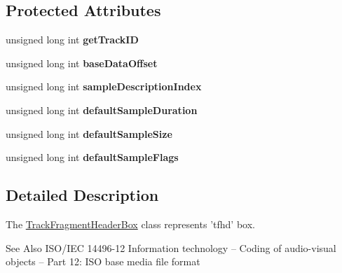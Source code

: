 \subsection*{Protected Attributes}
\begin{DoxyCompactItemize}
\item 
\hypertarget{class_track_fragment_header_box_a57b3fcda7632cb057f7366c6e553463d}{unsigned long int {\bfseries get\-Track\-I\-D}}\label{class_track_fragment_header_box_a57b3fcda7632cb057f7366c6e553463d}

\item 
\hypertarget{class_track_fragment_header_box_a7f7b9dd7d08115df2f90861151614d3b}{unsigned long int {\bfseries base\-Data\-Offset}}\label{class_track_fragment_header_box_a7f7b9dd7d08115df2f90861151614d3b}

\item 
\hypertarget{class_track_fragment_header_box_abf646a146a0412d93476177746e0e277}{unsigned long int {\bfseries sample\-Description\-Index}}\label{class_track_fragment_header_box_abf646a146a0412d93476177746e0e277}

\item 
\hypertarget{class_track_fragment_header_box_a4e2ecd660c328a452046f1a4c3546243}{unsigned long int {\bfseries default\-Sample\-Duration}}\label{class_track_fragment_header_box_a4e2ecd660c328a452046f1a4c3546243}

\item 
\hypertarget{class_track_fragment_header_box_afac1c5fa6d59ddaadb2290982fc18337}{unsigned long int {\bfseries default\-Sample\-Size}}\label{class_track_fragment_header_box_afac1c5fa6d59ddaadb2290982fc18337}

\item 
\hypertarget{class_track_fragment_header_box_aba2aa8846c5dac178978fe10f2acc733}{unsigned long int {\bfseries default\-Sample\-Flags}}\label{class_track_fragment_header_box_aba2aa8846c5dac178978fe10f2acc733}

\end{DoxyCompactItemize}


\subsection{Detailed Description}
The \hyperlink{class_track_fragment_header_box}{Track\-Fragment\-Header\-Box} class represents 'tfhd' box. 

\begin{DoxySeeAlso}{See Also}
I\-S\-O/\-I\-E\-C 14496-\/12 Information technology – Coding of audio-\/visual objects – Part 12\-: I\-S\-O base media file format 
\end{DoxySeeAlso}


